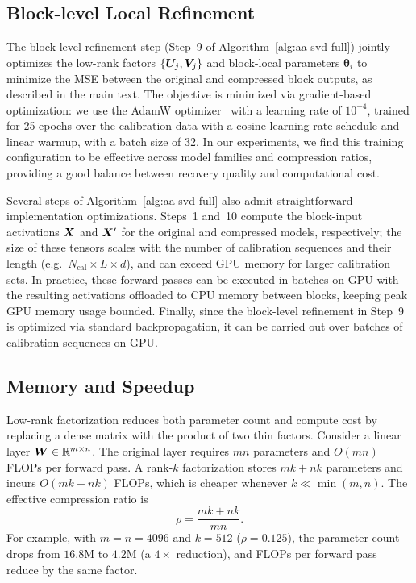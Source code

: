 \documentclass[10pt]{article} %
\theoremstyle{definition}
\theoremstyle{remark}
\begin{document}
\subsection{Block-level Local Refinement}
\label{sec:appendix_block}
The block-level refinement step (Step~9 of Algorithm~\ref{alg:aa-svd-full}) jointly optimizes the low-rank factors $\{{\bm{U}}_j, {\bm{V}}_j\}$ and block-local parameters $\boldsymbol{\theta}_i$ to minimize the MSE between the original and compressed block outputs, as described in the main text.
The objective is minimized via gradient-based optimization: we use the AdamW optimizer~\citep{loshchilov2017decoupled} with a learning rate of $10^{-4}$, trained for 25 epochs over the calibration data with a cosine learning rate schedule and linear warmup, with a batch size of 32.
In our experiments, we find this training configuration to be effective across model families and compression ratios, providing a good balance between recovery quality and computational cost.

Several steps of Algorithm~\ref{alg:aa-svd-full} also admit straightforward implementation optimizations.
Steps~1 and~10 compute the block-input activations ${\bm{X}}$ and ${\bm{X}}'$ for the original and compressed models, respectively; the size of these tensors scales with the number of calibration sequences and their length (e.g.\ $N_{\mathrm{cal}} \times L \times d$), and can exceed GPU memory for larger calibration sets.
In practice, these forward passes can be executed in batches on GPU with the resulting activations offloaded to CPU memory between blocks, keeping peak GPU memory usage bounded.
Finally, since the block-level refinement in Step~9 is optimized via standard backpropagation, it can be carried out over batches of calibration sequences on GPU.

\subsection{Memory and Speedup}
\label{sec:appendix_memory_speedup}

Low-rank factorization reduces both parameter count and compute cost by replacing a dense matrix with the product of two thin factors.
Consider a linear layer ${\bm{W}} \in \mathbb{R}^{m \times n}$.
The original layer requires $mn$ parameters and $O(mn)$ FLOPs per forward pass.
A rank-$k$ factorization stores $mk + nk$ parameters and incurs $O(mk + nk)$ FLOPs, which is cheaper whenever $k \ll \min(m,n)$.
The effective compression ratio is
\[
\rho = \frac{mk + nk}{mn}.
\]
For example, with $m=n=4096$ and $k=512$ ($\rho=0.125$), the parameter count drops from $16.8$M to $4.2$M (a $4\times$ reduction), and FLOPs per forward pass reduce by the same factor.
\end{document}
